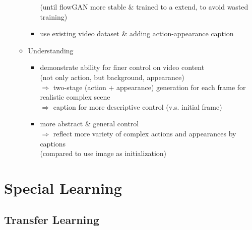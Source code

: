 \begin{itemize}
\begin{itemize}
\begin{itemize}
		(until flowGAN more stable \& trained to a extend, to avoid wasted training)
		\item use existing video dataset \& adding action-appearance caption
		\end{itemize}
	\item Understanding
		\begin{itemize}
		\item demonstrate ability for finer control on video content \\ 
		(not only action, but background, appearance) \\ 
		$\Rightarrow$ two-stage (action + appearance) generation for each frame for realistic complex scene\\
		$\Rightarrow$ caption for more descriptive control (v.s. initial frame)
		\item more abstract \& general control \\ 
		$\Rightarrow$ reflect more variety of complex actions and appearances by captions \\ 
		(compared to use image as initialization)
		\end{itemize}
	\end{itemize}
\end{itemize}

\section{Special Learning}
\subsection{Transfer Learning} \label{DL_Learning_Transfer}
